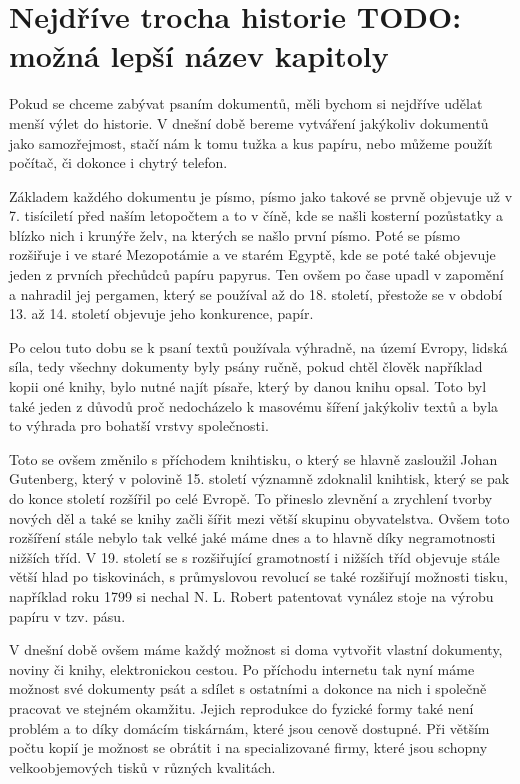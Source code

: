 \section{Nejdříve trocha historie TODO: možná lepší název kapitoly}

Pokud se chceme zabývat psaním dokumentů, měli bychom si nejdříve udělat menší výlet do historie. V dnešní době bereme vytváření
jakýkoliv dokumentů jako samozřejmost, stačí nám k tomu tužka a kus papíru, nebo můžeme použít počítač, či dokonce i chytrý telefon.

Základem každého dokumentu je písmo, písmo jako takové se prvně objevuje už v 7. tisíciletí před naším letopočtem a to v číně,
kde se našli kosterní pozůstatky a blízko nich i krunýře želv, na kterých se našlo první písmo. \cite{EarliestWriting} Poté se písmo rozšiřuje
i ve staré Mezopotámie a ve starém Egyptě, kde se poté také objevuje jeden z prvních přechůdců papíru papyrus. Ten ovšem po čase upadl
v zapomění a nahradil jej pergamen, který se používal až do 18. století, přestože se v období 13. až 14. století objevuje jeho konkurence, papír.

Po celou tuto dobu se k psaní textů používala výhradně, na území Evropy, lidská síla, tedy všechny dokumenty byly psány ručně, pokud chtěl člověk například
kopii oné knihy, bylo nutné najít písaře, který by danou knihu opsal. Toto byl také jeden z důvodů proč nedocházelo k masovému šíření jakýkoliv textů a byla
to výhrada pro bohatší vrstvy společnosti.

Toto se ovšem změnilo s příchodem knihtisku, o který se hlavně zasloužil Johan Gutenberg, který v polovině 15. století významně zdoknalil knihtisk,
který se pak do konce století rozšířil po celé Evropě. To přineslo zlevnění a zrychlení tvorby nových děl a také se knihy začli šířit mezi větší skupinu
obyvatelstva. Ovšem toto rozšíření stále nebylo tak velké jaké máme dnes a to hlavně díky negramotnosti nižších tříd. V 19. století se s rozšiřující gramotností
i nižších tříd objevuje stále větší hlad po tiskovinách, s průmyslovou revolucí se také rozšiřují možnosti tisku, například roku 1799 si nechal N. L. Robert
patentovat vynález stoje na výrobu papíru v tzv.  pásu. \cite{Papir}

V dnešní době ovšem máme každý možnost si doma vytvořit vlastní dokumenty, noviny či knihy, elektronickou cestou. Po příchodu internetu tak nyní máme možnost
své dokumenty psát a sdílet s ostatními a dokonce na nich i společně pracovat ve stejném okamžitu. Jejich reprodukce do fyzické formy také není problém a to díky
domácím tiskárnám, které jsou cenově dostupné. Při větším počtu kopií je možnost se obrátit i na specializované firmy, které jsou schopny velkoobjemových tisků
v různých kvalitách.